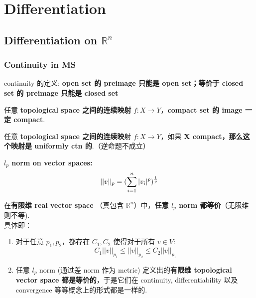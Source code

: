 \documentclass[lang=cn,11pt]{elegantbook}
\begin{document}
\chapter{Differentiation}
\section{Differentiation on $\mathbb{R}^n$}
\subsection{Continuity in MS}
\begin{remark}
    continuity 的定义: \textbf{open set 的 preimage 只能是 open set；等价于 closed set 的 preimage 只能是 closed set}
\end{remark}


\begin{theorem}
任意\textbf{ topological space 之间的连续映射} $ f:X \rightarrow Y$，\textbf{compact set 的 image 一定 compact}.
\end{theorem}

\begin{theorem}
任意 \textbf{topological space 之间的连续映}射 $f:X \rightarrow Y$，如果 \textbf{X compact，那么这个映射是 uniformly ctn 的}.（逆命题不成立）
\end{theorem}

\begin{definition}
    \textbf{$l_p$ norm on vector spaces:}\\
$$||v||_p = (\sum_{i = 1}^n |v_i|^p)^{1\over p}$$
\end{definition}

\begin{theorem}
    在\textbf{有限维 real vector space} （真包含 $\mathbb{R}^n$）中，\textbf{任意 $l_p$ norm 都等价}（无限维则不等).\\
    具体即：
    \begin{enumerate}
        \item 对于任意 $p_1, p_2$，都存在 $C_1, C_2$ 使得对于所有 $v\in V$:
        $$
        C_1||v||_{p_1} \leq ||v||_{p_2} \leq C_2||v||_{p_1}
        $$
        \item 任意 $l_p$ norm (通过差 norm 作为 metric) 定义出的\textbf{有限维 topological vector space 都是等价的}，于是它们在 continuity, differentiability 以及 convergence 等等概念上的形式都是一样的.
    \end{enumerate}
\end{theorem}
\end{document}
